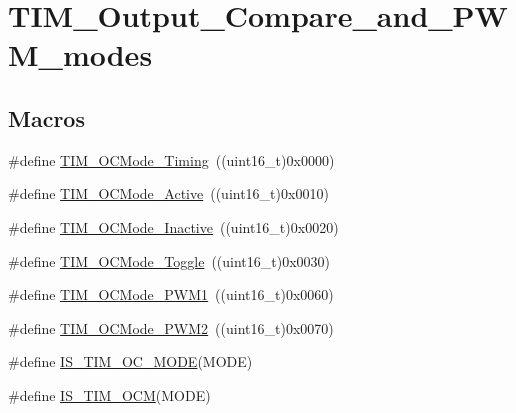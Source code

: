 \hypertarget{group___t_i_m___output___compare__and___p_w_m__modes}{}\section{T\+I\+M\+\_\+\+Output\+\_\+\+Compare\+\_\+and\+\_\+\+P\+W\+M\+\_\+modes}
\label{group___t_i_m___output___compare__and___p_w_m__modes}
\subsection*{Macros}
\begin{DoxyCompactItemize}
\item 
\#define \mbox{\hyperlink{group___t_i_m___output___compare__and___p_w_m__modes_ga54d5745fade3b2f8ea1325e7447ca760}{T\+I\+M\+\_\+\+O\+C\+Mode\+\_\+\+Timing}}~((uint16\+\_\+t)0x0000)
\item 
\#define \mbox{\hyperlink{group___t_i_m___output___compare__and___p_w_m__modes_ga76bac57d41dc67218772f9c745c77102}{T\+I\+M\+\_\+\+O\+C\+Mode\+\_\+\+Active}}~((uint16\+\_\+t)0x0010)
\item 
\#define \mbox{\hyperlink{group___t_i_m___output___compare__and___p_w_m__modes_gae0c350d7adaea14a37cabc2ab762695f}{T\+I\+M\+\_\+\+O\+C\+Mode\+\_\+\+Inactive}}~((uint16\+\_\+t)0x0020)
\item 
\#define \mbox{\hyperlink{group___t_i_m___output___compare__and___p_w_m__modes_ga8b8adb6e81fe88bd14d44430f7f97021}{T\+I\+M\+\_\+\+O\+C\+Mode\+\_\+\+Toggle}}~((uint16\+\_\+t)0x0030)
\item 
\#define \mbox{\hyperlink{group___t_i_m___output___compare__and___p_w_m__modes_gaefbe32dddc9630fbcc48b302b50d15fc}{T\+I\+M\+\_\+\+O\+C\+Mode\+\_\+\+P\+W\+M1}}~((uint16\+\_\+t)0x0060)
\item 
\#define \mbox{\hyperlink{group___t_i_m___output___compare__and___p_w_m__modes_ga722d8f33a795ef82ed7ae76dfbb7613d}{T\+I\+M\+\_\+\+O\+C\+Mode\+\_\+\+P\+W\+M2}}~((uint16\+\_\+t)0x0070)
\item 
\#define \mbox{\hyperlink{group___t_i_m___output___compare__and___p_w_m__modes_ga93d898976e236c135bfd02a0c213c8ec}{I\+S\+\_\+\+T\+I\+M\+\_\+\+O\+C\+\_\+\+M\+O\+DE}}(M\+O\+DE)
\item 
\#define \mbox{\hyperlink{group___t_i_m___output___compare__and___p_w_m__modes_ga45f530dd241d3b0787b5c2d62cd1b98f}{I\+S\+\_\+\+T\+I\+M\+\_\+\+O\+CM}}(M\+O\+DE)
\end{DoxyCompactItemize}


